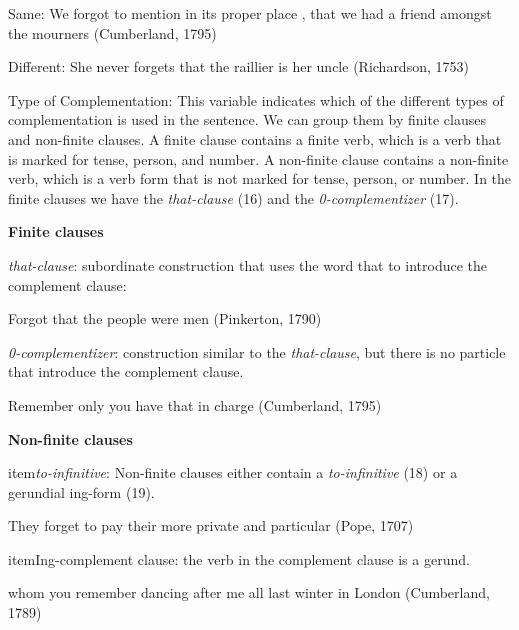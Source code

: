\documentclass[final]{clv3} %
\begin{document}
\begin{example}
Same: We forgot to mention in its proper place , that we had a friend amongst the mourners   (Cumberland, 1795)
\end{example}

\begin{example}
Different: She never forgets that the raillier is her uncle  (Richardson, 1753)
\end{example}

\item{Type of Complementation:} This variable indicates which of the different types of complementation is used in the sentence. We can group them by finite clauses and non-finite clauses. A finite clause contains a finite verb, which is a verb that is marked for tense, person, and number. A non-finite clause contains a non-finite verb, which is a verb form that is not marked for tense, person, or number. 
In the finite clauses we have the \textit{that-clause} (16) and the \textit{0-complementizer} (17). 

\item{\textbf{Finite clauses}}

\item{\textit{that-clause}:} subordinate construction that uses the word that to introduce the complement clause:
\begin{example}
Forgot that the people were men (Pinkerton, 1790)
\end{example}

\item{\textit{0-complementizer}:} construction similar to the \textit{that-clause}, but there is no particle that introduce the complement clause.
\begin{example}
Remember only you have that in charge  (Cumberland, 1795)
\end{example}

\item{\textbf{Non-finite clauses}}

item{\textit{to-infinitive}:} Non-finite clauses either contain a \textit{to-infinitive} (18) or a gerundial ing-form (19).
\begin{example}
They forget to pay their more private and particular  (Pope, 1707)
\end{example}
item{Ing-complement clause:} the verb in the complement clause is a gerund.
\begin{example}
whom you remember dancing after me all last winter in London   (Cumberland, 1789)
\end{example}
\end{document}
